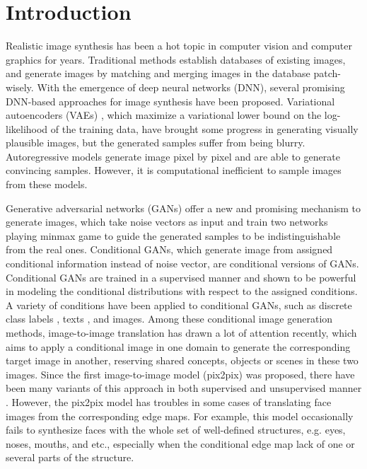 \section{Introduction}
Realistic image synthesis has been a hot topic in computer vision and computer graphics for years. 
Traditional methods \cite{EBSR, TextureSyn,SceneCompletion} establish databases of existing images, and generate images by matching and merging images in the database patch-wisely. 
With the emergence of deep neural networks (DNN), several promising DNN-based approaches for image synthesis have been proposed. 
Variational autoencoders (VAEs) \cite{VAEs}, which maximize a variational lower bound on the log-likelihood of the training data, have brought some progress in generating visually plausible images, but the generated samples suffer from being blurry. 
Autoregressive models \cite{PixelCNN} generate image pixel by pixel and are able to generate convincing samples. However, it is computational inefficient to sample images from these models.
%

Generative adversarial networks (GANs) \cite{GANs} offer a new and promising mechanism to generate images, which take noise vectors as input and train two networks playing minmax game to guide the generated samples to be indistinguishable from the real ones. 
Conditional GANs, which generate image from assigned conditional information instead of noise vector, are conditional versions of GANs. Conditional GANs are trained in a supervised manner and shown to be powerful in modeling the conditional distributions with respect to the assigned conditions. A variety of conditions have been applied to conditional GANs, such as discrete class labels \cite{cGANs}, texts \cite{StackGANs, StackGANs++}, and images.
%
Among these conditional image generation methods, image-to-image translation has drawn a lot of attention recently, which aims to apply a conditional image in one domain to generate the corresponding target image in another, reserving shared concepts, objects or scenes in these two images. Since the first image-to-image model (pix2pix)  \cite{pix2pix} was proposed, there have been many variants of this approach in both supervised and unsupervised manner \cite{CycleGANs, DualGANs,CoupleGANs,BicycleGANs}. %
However, the pix2pix model has troubles in some cases of translating face images from the corresponding edge maps. For example, this model occasionally fails to synthesize faces with the whole set of well-defined structures, e.g. eyes, noses, mouths, and etc., especially when the conditional edge map lack of one or several parts of the structure. 

